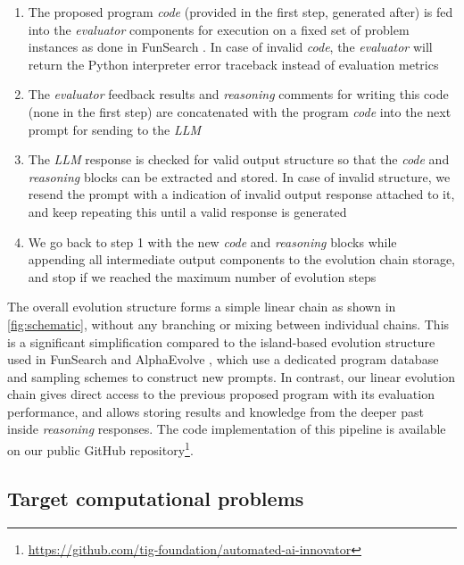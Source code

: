 \documentclass[12pt, legalpaper]{article}
\begin{document}
\begin{enumerate}
    \item The proposed program \emph{code} (provided in the first step, generated after) is fed into the \emph{evaluator} components for execution on a fixed set of problem instances as done in FunSearch \citep{romera2024mathematical}. In case of invalid \emph{code}, the \emph{evaluator} will return the Python interpreter error traceback instead of evaluation metrics

    \item The \emph{evaluator} feedback results and \emph{reasoning} comments for writing this code (none in the first step) are concatenated with the program \emph{code} into the next prompt for sending to the \emph{LLM}

    \item The \emph{LLM} response is checked for valid output structure so that the \emph{code} and \emph{reasoning} blocks can be extracted and stored. In case of invalid structure, we resend the prompt with a indication of invalid output response attached to it, and keep repeating this until a valid response is generated

    \item We go back to step 1 with the new \emph{code} and \emph{reasoning} blocks while appending all intermediate output components to the evolution chain storage, and stop if we reached the maximum number of evolution steps
\end{enumerate}
%
The overall evolution structure forms a simple linear chain as shown in \autoref{fig:schematic}, without any branching or mixing between individual chains. 
This is a significant simplification compared to the island-based evolution structure used in FunSearch and AlphaEvolve \citep{romera2024mathematical, novikov2025alphaevolve}, which use a dedicated program database and sampling schemes to construct new prompts. 
In contrast, our linear evolution chain gives direct access to the previous proposed program with its evaluation performance, and allows storing results and knowledge from the deeper past inside \emph{reasoning} responses. 
The code implementation of this pipeline is available on our public GitHub repository\footnote{\url{https://github.com/tig-foundation/automated-ai-innovator}}. 






\subsection{Target computational problems}\label{sec:comptasks}
\end{document}
